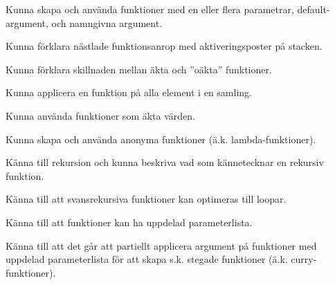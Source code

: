 
\item Kunna skapa och använda funktioner med en eller flera parametrar, default-argument, och namngivna argument.
\item Kunna förklara nästlade funktionsanrop med aktiveringsposter på stacken.
\item Kunna förklara skillnaden mellan äkta och ''oäkta'' funktioner.
\item Kunna applicera en funktion på alla element i en samling.

\item Kunna använda funktioner som äkta värden.
\item Kunna skapa och använda anonyma funktioner (ä.k. lambda-funktioner).

\item Känna till rekursion och kunna beskriva vad som kännetecknar en rekursiv funktion.
\item Känna till att svansrekursiva funktioner kan optimeras till loopar.

\item Känna till att funktioner kan ha uppdelad parameterlista.
\item Känna till att det går att partiellt applicera argument på funktioner med uppdelad parameterlista för att skapa s.k. stegade funktioner (ä.k. curry-funktioner).
